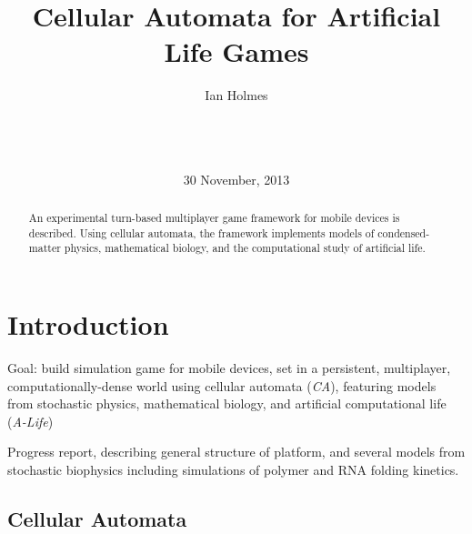 \documentclass{acm_proc_article-sp}
\begin{document}
\title{Cellular Automata for Artificial Life Games}
\author{
\alignauthor
Ian Holmes\\
       \\
       \\
       \\
}
\date{30 November, 2013}

\maketitle
\begin{abstract}
An experimental turn-based multiplayer game framework for mobile devices is described.
Using cellular automata, the framework implements models
of condensed-matter physics, mathematical biology,
and the computational study of artificial life.
\end{abstract}



\section{Introduction}

Goal: 
build simulation game for mobile devices,
set in a persistent, multiplayer, computationally-dense world
using cellular automata ({\em CA}),
featuring models from
stochastic physics,
mathematical biology,
 and
artificial computational life ({\em A-Life})

Progress report, describing general structure of platform,
and several models from stochastic biophysics
including simulations of polymer and RNA folding kinetics.

\subsection{Cellular Automata}
\end{document}
